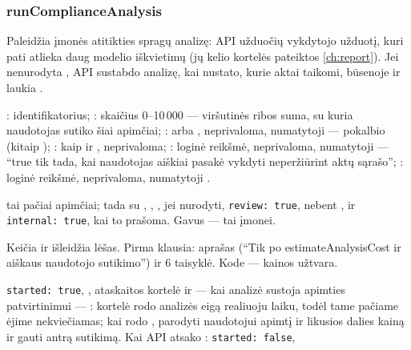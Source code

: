 \subsubsection{runComplianceAnalysis}\label{sec:tools:runComplianceAnalysis}
\begin{description}[style=multiline, leftmargin=19mm, labelwidth=17mm, labelsep=2mm,
  font=\sffamily\bfseries\footnotesize\color{ink}, itemsep=1pt, topsep=2pt, before=\raggedright]
  \item[Paskirtis] Paleidžia įmonės atitikties spragų analizę: API užduočių vykdytojo užduotį,
    kuri pati atlieka daug modelio iškvietimų (jų kelio kortelės pateiktos \cref{ch:report}).
    Jei nenurodyta , API sustabdo analizę, kai nustato, kurie aktai taikomi,
    būsenoje  ir laukia .
  \item[Įvestis] : identifikatorius; : skaičius
    0--10\,000 --- viršutinės ribos suma, su kuria naudotojas sutiko šiai apimčiai;
    :  arba , neprivaloma, numatytoji --- pokalbio (kitaip
    ); : kaip ir , neprivaloma;
    : loginė reikšmė, neprivaloma, numatytoji  ---
    \enquote{true tik tada, kai naudotojas aiškiai pasakė vykdyti neperžiūrint aktų sąrašo};
    : loginė reikšmė, neprivaloma, numatytoji .
  \item[Užklausos]  tai pačiai apimčiai; tada
     su , , , jei
    nurodyti, \texttt{review: true}, nebent , ir \texttt{internal: true}, kai
    to prašoma. Gavus  ---  tai įmonei.
  \item[Pobūdis] Keičia ir išleidžia lėšas. Pirma klausia: aprašas (\enquote{Tik po
    estimateAnalysisCost ir aiškaus naudotojo sutikimo}) ir 6 taisyklė. Kode --- kainos
    užtvara.
  \item[Grąžina] \texttt{started: true}, , ataskaitos kortelė ir --- kai
    analizė sustoja apimties patvirtinimui --- : kortelė rodo analizės eigą realiuoju
    laiku, todėl tame pačiame ėjime  nekviečiamas; kai  rodo
    , parodyti naudotojui apimtį ir likusios dalies kainą ir gauti antrą
    sutikimą. Kai API atsako : \texttt{started: false},

\end{description}
